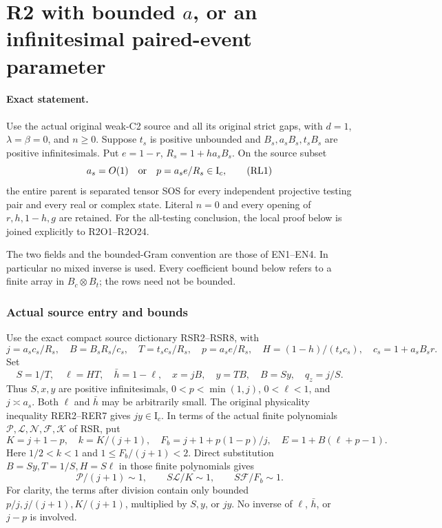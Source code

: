 \section{\texorpdfstring{R2 with bounded \(a\), or an infinitesimal paired-event parameter}{R2 with bounded a, or an infinitesimal paired-event parameter}}
\label{component:p393d3faa269a}

\label{p393d3faa269a:sec:r2-shifted-local}

\paragraph{Exact statement.}
Use the actual original weak-C2 source and all its original strict
gaps, with \(d=1\), \(\lambda=\beta=0\), and \(n\geq0\).
Suppose \(t_s\) is positive unbounded and
\(B_s,a_sB_s,t_sB_s\) are positive infinitesimals.
Put \(e=1-r\), \(R_s=1+ha_sB_s\).  On the source subset
\[
       a_s=O(1)\quad\hbox{or}\quad
       p=a_s e/R_s\in\mathrm I_c,                     \tag{RL1}
\]
the entire parent is separated tensor SOS for every independent
projective testing pair and every real or complex state.
Literal \(n=0\) and every opening of \(r,h,1-h,g\) are retained.
For the all-testing conclusion, the local proof below is joined
explicitly to R2O1--R2O24.

The two fields and the bounded-Gram convention are those of EN1--EN4.
In particular no mixed inverse is used.  Every coefficient bound
below refers to a finite array in \(B_c\otimes B_t\); the rows need
not be bounded.

\subsubsection*{Actual source entry and bounds}

Use the exact compact source dictionary RSR2--RSR8, with
\[
 j=a_sc_s/R_s,\quad B=B_sR_s/c_s,\quad T=t_sc_s/R_s,\quad
 p=a_se/R_s,\quad H=(1-h)/(t_sc_s),\quad c_s=1+a_sB_sr.
\]
Set
\[
 S=1/T,\quad \ell=HT,\quad \bar h=1-\ell,\quad
 x=jB,\quad y=TB,\quad B=Sy,\quad q_z=j/S .
                                                               \tag{RL2}
\]
Thus \(S,x,y\) are positive infinitesimals,
\(0<p<\min(1,j)\), \(0<\ell<1\), and \(j\asymp a_s\).
Both \(\ell\) and \(\bar h\) may be arbitrarily small.
The original physicality inequality RER2--RER7 gives \(jy\in\mathrm I_c\).
In terms of the actual finite polynomials \(\mathcal P,\mathcal L,
\mathcal N,\mathcal F,\mathcal K\) of RSR, put
\[
 K=j+1-p,\quad k=K/(j+1),\quad
 F_b=j+1+p(1-p)/j,\quad E=1+B(\ell+p-1).
                                                               \tag{RL3}
\]
Here \(1/2<k<1\) and \(1\le F_b/(j+1)<2\).  Direct substitution
\(B=Sy,T=1/S,H=S\ell\) in those finite polynomials gives
\[
 \mathcal P/(j+1)\sim1,\qquad
 S\mathcal L/K\sim1,\qquad S\mathcal F/F_b\sim1.         \tag{RL4}
\]
For clarity, the terms after division contain only bounded
\(p/j,j/(j+1),K/(j+1)\), multiplied by \(S,y\), or \(jy\).
No inverse of \(\ell\), \(\bar h\), or \(j-p\) is involved.


